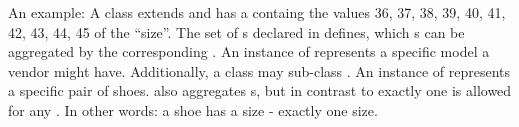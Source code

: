 An example: A class  extends  and has a  containg the values 36, 37, 38, 39, 40, 41, 42, 43, 44, 45 of the  ``size''.
The set of s declared in  defines, which s can be aggregated by the corresponding .
An instance of  represents a specific model a vendor might have.
Additionally, a class  may sub-class .
An instance of  represents a specific pair of shoes.
 also aggregates s, but in contrast to  exactly one  is allowed for any .
In other words: a shoe has a size - exactly one size.


